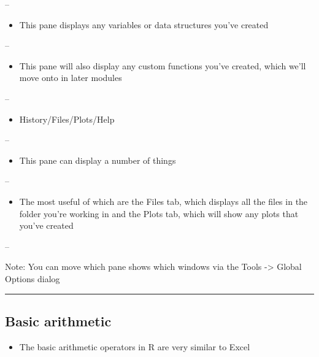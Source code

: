 \documentclass[]{article}
\providecommand{\tightlist}{%
  \setlength{\itemsep}{0pt}\setlength{\parskip}{0pt}}
\begin{document}
--

\begin{itemize}
\tightlist
\item
  This pane displays any variables or data structures you've created
\end{itemize}

--

\begin{itemize}
\tightlist
\item
  This pane will also display any custom functions you've created, which
  we'll move onto in later modules
\end{itemize}

--

\begin{itemize}
\tightlist
\item
  History/Files/Plots/Help
\end{itemize}

--

\begin{itemize}
\tightlist
\item
  This pane can display a number of things
\end{itemize}

--

\begin{itemize}
\tightlist
\item
  The most useful of which are the Files tab, which displays all the
  files in the folder you're working in and the Plots tab, which will
  show any plots that you've created
\end{itemize}

--

Note: You can move which pane shows which windows via the Tools
-\textgreater{} Global Options dialog

\begin{center}\rule{0.5\linewidth}{\linethickness}\end{center}

\hypertarget{basic-arithmetic}{%
\subsection{Basic arithmetic}\label{basic-arithmetic}}

\begin{itemize}
\tightlist
\item
  The basic arithmetic operators in R are very similar to Excel
\end{itemize}
\end{document}
